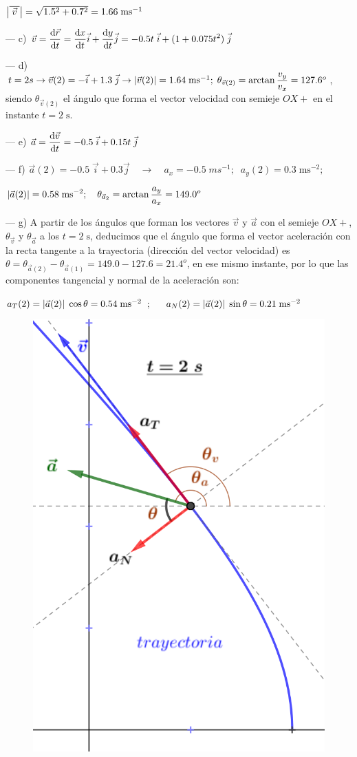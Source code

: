 $\abs{\displaystyle \overline{\;\vec v\; }}=\sqrt{1.5^2+0.7^2}=1.66\; \mathrm{ms}^{-1}$

--- c) $\vec v=\displaystyle\dv{\vec r}{t}= \dv{x}{t}\vec i+\dv{y}{t} \vec j= -0.5t\;\vec i + (1+0.075t^2)\;\vec j $

--- d) $t=2s \to \vec v(2)=-\vec i+1.3\; \vec j \to \abs{\vec v(2)}= 1.64\; \mathrm{ms}^{-1};\; \theta_{\vec v(2)}=\arctan \dfrac {v_y} {v_x}=127.6^o$, siendo $\theta_{\vec v(2)}$ el ángulo que forma el vector velocidad con semieje $OX+$ en el instante $t=2\; \mathrm{s}$.

--- e) $\displaystyle \vec a= \dv{\vec v}{t}=-0.5\;\vec i+ 0.15t\; \vec j$

--- f) $\vec a(2)=-0.5\;\vec i+0.3\vec j \quad \to \quad a_x=-0.5 \; ms^{-1}; \; \; a_y(2)=0.3\;\mathrm{ms}^{-2};$

$\displaystyle   \abs{\vec a(2)}= 0.58\; \mathrm{ms}^{-2};\quad \theta_{\vec a_2}=\arctan \dfrac {a_y} {a_x}=149.0^o$


--- g) A partir de los ángulos que forman los vectores $\vec v$ y $\vec a$ con el semieje $OX+$, $\theta_{\vec v}$ y $\theta_{\vec a}$ a los $t=2\; \mathrm{s}$, deducimos que el ángulo que forma el vector aceleración con la recta tangente a la trayectoria (dirección del vector velocidad) es $\theta=\theta_{\vec a(2)}-\theta_{\vec a(1)}=149.0-127.6=21.4^o$, en ese mismo instante, por lo que las componentes tangencial y normal de la aceleración son:




$a_T(2)=\abs{\vec a(2)}\; \cos \theta=0.54\; \mathrm{ms}^{-2}$
$;\quad$
$a_N(2)=\abs{\vec a(2)}\; \sin \theta=0.21\; \mathrm{ms}^{-2}$

\begin{figure}[H]
		\centering
		\includegraphics[width=.5\textwidth]{imagenes/imagenes02/T02IM19.png}
		\end{figure}


